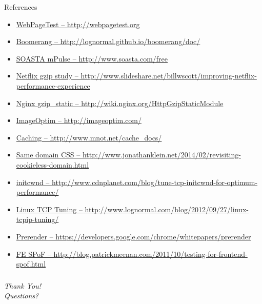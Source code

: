 \documentclass{beamer}
\newcommand{\innersplash}[1]{
  \begin{center}
    \Large \textrm{\textit{ #1 } }
  \end{center}
}
\newcommand{\splashslide}[2][{}]{
  \begin{frame}
  \frametitle{#1}
  \innersplash{#2}
  \end{frame}
}
\begin{document}
\begin{frame}{References}
\begin{itemize}
  \item \tiny \href{http://webpagetest.org}{WebPageTest -- http://webpagetest.org}
  \item \tiny \href{http://lognormal.github.io/boomerang/doc/}{Boomerang -- http://lognormal.github.io/boomerang/doc/}
  \item \tiny \href{http://www.soasta.com/free}{SOASTA mPulse -- http://www.soasta.com/free}
  \item \tiny \href{http://www.slideshare.net/billwscott/improving-netflix-performance-experience}{Netflix gzip study -- http://www.slideshare.net/billwscott/improving-netflix-performance-experience}
  \item \tiny \href{http://wiki.nginx.org/HttpGzipStaticModule}{Nginx gzip\_static -- http://wiki.nginx.org/HttpGzipStaticModule}
  \item \tiny \href{http://imageoptim.com/}{ImageOptim -- http://imageoptim.com/}
  \item \tiny \href{http://www.mnot.net/cache_docs/}{Caching -- http://www.mnot.net/cache\_docs/}
  \item \tiny \href{http://www.jonathanklein.net/2014/02/revisiting-cookieless-domain.html}{Same domain CSS -- http://www.jonathanklein.net/2014/02/revisiting-cookieless-domain.html}
  \item \tiny \href{http://www.cdnplanet.com/blog/tune-tcp-initcwnd-for-optimum-performance/}{initcwnd -- http://www.cdnplanet.com/blog/tune-tcp-initcwnd-for-optimum-performance/}
  \item \tiny \href{http://www.lognormal.com/blog/2012/09/27/linux-tcpip-tuning/}{Linux TCP Tuning -- http://www.lognormal.com/blog/2012/09/27/linux-tcpip-tuning/}
  \item \tiny \href{https://developers.google.com/chrome/whitepapers/prerender}{Prerender -- https://developers.google.com/chrome/whitepapers/prerender}
  \item \tiny \href{http://blog.patrickmeenan.com/2011/10/testing-for-frontend-spof.html}{FE SPoF -- http://blog.patrickmeenan.com/2011/10/testing-for-frontend-spof.html}
\end{itemize}
\end{frame}

\splashslide{Thank You! \\ Questions?}
\end{document}
